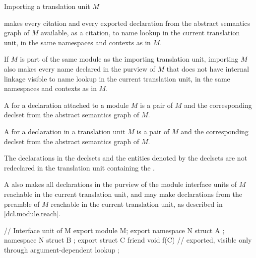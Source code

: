 \begin{std.txt}
  \alinea
  \begin{after}\color{addclr}
  Importing a translation unit $M$
  \end{after}
  makes every citation and every
  exported declaration
  from the 
  abstract semantics graph of $M$ available, as a citation,
  to name lookup in
  the current translation unit, in the same namespaces and contexts
  as in $M$.
  \begin{after}\color{addclr}
  If $M$ is part of the same module as the importing translation unit,
  importing $M$ also makes every name declared in the purview of $M$
  that does not have internal linkage visible to name lookup
  in the current translation unit, in the same namespaces and contexts
  as in $M$.
  \end{after}
  \begin{before}\color{addclr}
  A  for a declaration attached to a module $M$ is a pair of
  $M$ and the corresponding declset from the abstract semantics graph 
  of $M$. 
  \end{before}
  \begin{after}\color{addclr}
  A  for a declaration in a translation unit $M$ is a pair of
  $M$ and the corresponding declset from the abstract semantics graph 
  of $M$. 
  \end{after}
  \enternote
  The declarations in the declsets and the entities denoted by the declsets
  are not redeclared in the translation unit
  containing the .
  \exitnote

  \begin{after}\color{addclr}
  \alinea
  \enternote
  A  also makes all
  declarations in the purview of the module interface units of $M$
  reachable in the current translation unit, and may make declarations
  from the preamble of $M$ reachable in the current translation
  unit, as described in \ref{dcl.module.reach}.
  \exitnote
  \end{after}
  \begin{example}
  \begin{Program}
     // Interface unit of M
     export module M;
     export namespace N {
        struct A { };
     }
     namespace N {
        struct B { };
        export struct C {
           friend void f(C) { }  // exported, visible only through argument-dependent lookup
        };
     }


\end{Program}
\end{example}
\end{std.txt}
